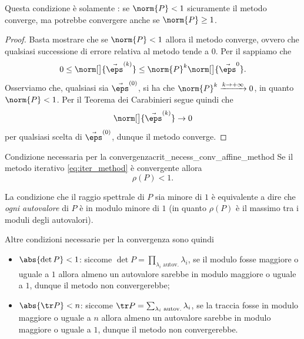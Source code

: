 \begin{remark}
    Questa condizione è solamente : se $\norm{P} < 1$ sicuramente il metodo converge, ma potrebbe convergere anche se $\norm{P} \geq 1$.  
\end{remark}

\begin{proof}
    Basta mostrare che se $\norm{P} < 1$ allora il metodo converge, ovvero che qualsiasi successione di errore relativa al metodo tende a $0$. Per il  sappiamo che \[
        0 \leq \norm[\big]{\vec \eps^{(k)}} \leq \norm{P}^k \norm[\big]{\vec \eps^{0}}.
    \] Osserviamo che, qualsiasi sia $\vec \eps^{(0)}$, si ha che $\norm{P}^k \xrightarrow{k \to +\infty} 0$, in quanto $\norm{P} < 1$. Per il Teorema dei Carabinieri segue quindi che \[
        \norm[\big]{\vec \eps^{(k)}} \to 0
    \] per qualsiasi scelta di $\vec \eps^{(0)}$, dunque il metodo converge. 
\end{proof}

\begin{theorem}
    {Condizione necessaria per la convergenza}{crit_necess_conv_affine_method}
    Se il metodo iterativo \eqref{eq:iter_method} è convergente allora \[
        \rho(P) < 1.
    \]
\end{theorem}

La condizione che il raggio spettrale di $P$ sia minore di $1$ è equivalente a dire che \emph{ogni autovalore} di $P$ è in modulo minore di $1$ (in quanto $\rho(P)$ è il massimo tra i moduli degli autovalori).

Altre condizioni necessarie per la convergenza sono quindi \begin{itemize}
    \item $\abs{\det P} < 1$: siccome $\det P = \prod_{\lambda_i \text{ autov.}} \lambda_i$, se il modulo fosse maggiore o uguale a $1$ allora almeno un autovalore sarebbe in modulo maggiore o uguale a $1$, dunque il metodo non convergerebbe;
    \item $\abs{\tr P} < n$: siccome $\tr P = \sum_{\lambda_i \text{ autov.}} \lambda_i$, se la traccia fosse in modulo maggiore o uguale a $n$ allora almeno un autovalore sarebbe in modulo maggiore o uguale a $1$, dunque il metodo non convergerebbe.    
\end{itemize}

